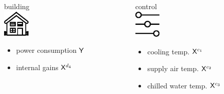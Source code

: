\begin{frame}[t]
\begin{columns}[t]
		\begin{column}{0.33\textwidth}
			\begin{center}
				\Large
				\textcolor{mycolor}{building} \\
				\small
				\vspace{0.4cm}
				\includegraphics[width=3pc]{figures/building.eps}
				\begin{itemize}
					\centering
					\item \color{blue} power consumption $\mathsf{Y}$
					\item \color{red} internal gains $\mathsf{X}^{d_4}$
					
				\end{itemize}
			\end{center}
		\end{column}
		
		\begin{column}{0.33\textwidth}
			\begin{center}
				\Large
				\textcolor{mycolor}{control} \\
				\small
				\vspace{0.4cm}
				\includegraphics[width=3pc]{figures/controls.eps}
			\end{center}
			\begin{center}
				\begin{itemize}
					\centering
					\item \color{ForestGreen} cooling temp. $\mathsf{X}^{c_1}$
					\item \color{ForestGreen} supply air temp. $\mathsf{X}^{c_2}$
					\item \color{ForestGreen} chilled water temp. $\mathsf{X}^{c_3}$
				\end{itemize}
			\end{center}
		\end{column}
		

\end{columns}
\end{frame}
